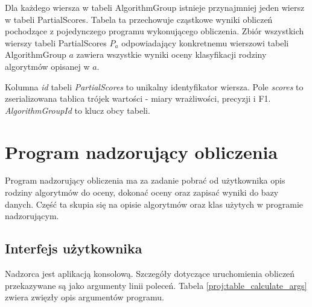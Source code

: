 \documentclass[../thesis.tex]{subfiles}
\begin{document}
Dla każdego wiersza w tabeli AlgorithmGroup istnieje przynajmniej jeden wiersz w tabeli PartialScores. Tabela ta przechowuje cząstkowe wyniki obliczeń pochodzące z pojedynczego programu wykonującego obliczenia. Zbiór wszystkich wierszy tabeli PartialScores $P_a$ odpowiadający konkretnemu wierszowi tabeli AlgorithmGroup $a$ zawiera wszystkie wyniki oceny klasyfikacji rodziny algorytmów opisanej w $a$.

Kolumna \emph{id} tabeli \emph{PartialScores} to unikalny identyfikator wiersza. Pole \emph{scores} to zserializowana tablica trójek wartości - miary wrażliwości, precyzji i F1. \emph{AlgorithmGroupId} to klucz obcy tabeli.

\section{Program nadzorujący obliczenia}
\label{proj:supervisor}

Program nadzorujący obliczenia ma za zadanie pobrać od użytkownika opis rodziny algorytmów do oceny, dokonać oceny oraz zapisać wyniki do bazy danych. Część ta skupia się na opisie algorytmów oraz klas użytych w programie nadzorującym.

\subsection{Interfejs użytkownika}

Nadzorca jest aplikacją konsolową. Szczegóły dotyczące uruchomienia obliczeń przekazywane są jako argumenty linii poleceń. Tabela \ref{proj:table_calculate_args} zwiera zwięzły opis argumentów programu. 
\end{document}
